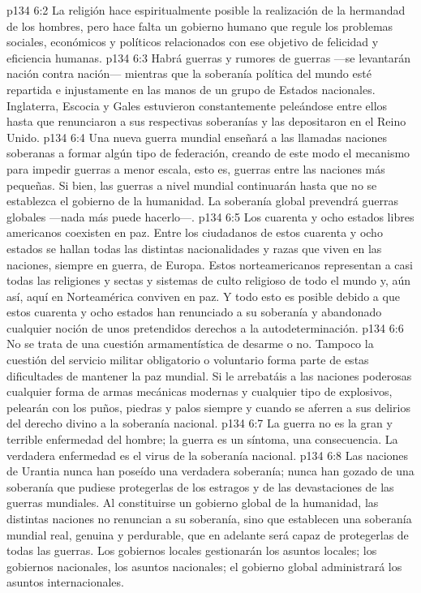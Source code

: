 \vs p134 6:2 La religión hace espiritualmente posible la realización de la hermandad de los hombres, pero hace falta un gobierno humano que regule los problemas sociales, económicos y políticos relacionados con ese objetivo de felicidad y eficiencia humanas.
\vs p134 6:3 Habrá guerras y rumores de guerras ---se levantarán nación contra nación--- mientras que la soberanía política del mundo esté repartida e injustamente en las manos de un grupo de Estados nacionales. Inglaterra, Escocia y Gales estuvieron constantemente peleándose entre ellos hasta que renunciaron a sus respectivas soberanías y las depositaron en el Reino Unido.
\vs p134 6:4 Una nueva guerra mundial enseñará a las llamadas naciones soberanas a formar algún tipo de federación, creando de este modo el mecanismo para impedir guerras a menor escala, esto es, guerras entre las naciones más pequeñas. Si bien, las guerras a nivel mundial continuarán hasta que no se establezca el gobierno de la humanidad. La soberanía global prevendrá guerras globales ---nada más puede hacerlo---.
\vs p134 6:5 Los cuarenta y ocho estados libres americanos coexisten en paz. Entre los ciudadanos de estos cuarenta y ocho estados se hallan todas las distintas nacionalidades y razas que viven en las naciones, siempre en guerra, de Europa. Estos norteamericanos representan a casi todas las religiones y sectas y sistemas de culto religioso de todo el mundo y, aún así, aquí en Norteamérica conviven en paz. Y todo esto es posible debido a que estos cuarenta y ocho estados han renunciado a su soberanía y abandonado cualquier noción de unos pretendidos derechos a la autodeterminación.
\vs p134 6:6 No se trata de una cuestión armamentística de desarme o no. Tampoco la cuestión del servicio militar obligatorio o voluntario forma parte de estas dificultades de mantener la paz mundial. Si le arrebatáis a las naciones poderosas cualquier forma de armas mecánicas modernas y cualquier tipo de explosivos, pelearán con los puños, piedras y palos siempre y cuando se aferren a sus delirios del derecho divino a la soberanía nacional.
\vs p134 6:7 La guerra no es la gran y terrible enfermedad del hombre; la guerra es un síntoma, una consecuencia. La verdadera enfermedad es el virus de la soberanía nacional.
\vs p134 6:8 Las naciones de Urantia nunca han poseído una verdadera soberanía; nunca han gozado de una soberanía que pudiese protegerlas de los estragos y de las devastaciones de las guerras mundiales. Al constituirse un gobierno global de la humanidad, las distintas naciones no renuncian a su soberanía, sino que establecen una soberanía mundial real, genuina y perdurable, que en adelante será capaz de protegerlas de todas las guerras. Los gobiernos locales gestionarán los asuntos locales; los gobiernos nacionales, los asuntos nacionales; el gobierno global administrará los asuntos internacionales.
